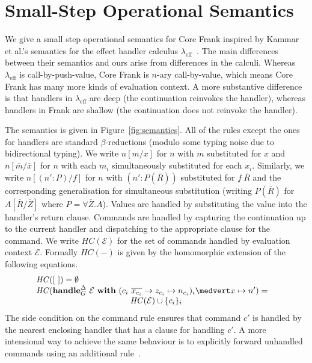 \documentclass[11pt]{article}
\makeatletter
\newcommand{\lameff}{$\lambda_{\text{eff}}$\xspace}
\newcommand{\lameffrow}{$\lambda_{\text{eff}}^\rho$\xspace}
\newcommand{\EC}{\mathcal{E}}
\newcommand{\many}{\overline}
\newcommand\ba{\begin{array}}
\newcommand\ea{\end{array}}
\newcommand{\bl}{\ba[t]{@{}l@{}}}
\newcommand{\el}{\ea}
\newcommand{\key}[1]{\textbf{#1}} %
\newcommand{\var}{\mathit}        %
\newcommand{\handleSymbol}{\rightarrow}
\newcommand{\handle}[2]{{#1} \handleSymbol {#2}}
\newcommand{\adj}{\Delta}
\makeatother
\begin{document}
\section{Small-Step Operational Semantics}
\label{sec:semantics}

We give a small step operational semantics for Core Frank inspired by
Kammar et al.'s semantics for the effect handler calculus
\lameff~\cite{KammarLO13}.
%
The main differences between their semantics and ours arise from
differences in the calculi. Whereas \lameff is call-by-push-value,
Core Frank is $n$-ary call-by-value, which means Core Frank has many
more kinds of evaluation context.
%
A more substantive difference is that handlers in \lameff are deep
(the continuation reinvokes the handler), whereas handlers in Frank
are shallow (the continuation does not reinvoke the handler).
%

The semantics is given in Figure~\ref{fig:semantics}.  All of the
rules except the ones for handlers are standard $\beta$-reductions
(modulo some typing noise due to bidirectional typing).
%
We write $n[m / x]$ for $n$ with $m$ substituted for $x$ and
$n[\many{m} / \many{x}]$ for $n$ with each $m_i$ simultaneously
substituted for each $x_i$.
%
Similarly, we write $n[(n' : P)/f]$ for $n$ with $(n' : P(\many{R}))$
substituted for $f~\many{R}$ and the corresponding generalisation for
simultaneous substitution (writing $P(\many{R})$ for
$A[\many{R}/\many{Z}]$ where $P = \forall \many{Z}.A$).
%
Values are handled by substituting the value into the handler's return
clause. Commands are handled by capturing the continuation up to the
current handler and dispatching to the appropriate clause for the
command. We write $\var{HC}(\EC)$ for the set of commands handled by
evaluation context $\EC$. Formally $\var{HC}(-)$ is given by the
homomorphic extension of the following equations.
%
\[
\bl
\var{HC}([~]) = \emptyset \\
\var{HC}(\key{handle}^\adj_G~ \EC ~\key{with}~
            (\handle{c_i~\many{x_{c_i}}}{z_{c_i}} \mapsto n_{c_i})_i \medvert
            x \mapsto n') =\quad \\
\hfill \var{HC}(\EC) \cup \{c_i\}_i \\
\el
\]
%
The side condition on the command rule ensures that command $c'$ is
handled by the nearest enclosing handler that has a clause for
handling $c'$.
%
A more intensional way to achieve the same behaviour is to explicitly
forward unhandled commands using an additional rule~\cite{KammarLO13}.
\end{document}
